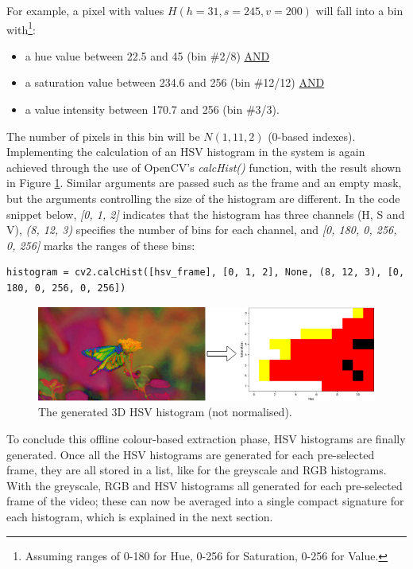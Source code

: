 For example, a pixel with values $H(h=31, s=245, v=200)$ will fall into a bin with\footnote{Assuming ranges of 0-180 for Hue, 0-256 for Saturation, 0-256 for Value.}:
\begin{itemize}
    \item a hue value between 22.5 and 45 (bin \#2/8) \underline{AND}
    \item a saturation value between 234.6 and 256 (bin \#12/12) \underline{AND} 
    \item a value intensity between 170.7 and 256 (bin \#3/3).
\end{itemize}
The number of pixels in this bin will be $N(1,11,2)$ (0-based indexes).\\

Implementing the calculation of an HSV histogram in the system is again achieved through the use of OpenCV's \textit{calcHist()} function, with the result shown in Figure \ref{fig:implementation-hsv_not_normalised}. Similar arguments are passed such as the frame and an empty mask, but the arguments controlling the size of the histogram are different. In the code snippet below, \textit{[0, 1, 2]} indicates that the histogram has three channels (H, S and V), \textit{(8, 12, 3)} specifies the number of bins for each channel, and \textit{[0, 180, 0, 256, 0, 256]} marks the ranges of these bins:

\begin{lstlisting}[numbers=none]
histogram = cv2.calcHist([hsv_frame], [0, 1, 2], None, (8, 12, 3), [0, 180, 0, 256, 0, 256])
\end{lstlisting}

\begin{figure}[h] 
\centerline{\includegraphics[width=\textwidth]{figures/implementation/hsv_not_normalised.png}}
\caption{\label{fig:implementation-hsv_not_normalised}The generated 3D HSV histogram (not normalised).}
\end{figure}

To conclude this offline colour-based extraction phase, HSV histograms are finally generated. Once all the HSV histograms are generated for each pre-selected frame, they are all stored in a list, like for the greyscale and RGB histograms. With the greyscale, RGB and HSV histograms all generated for each pre-selected frame of the video; these can now be averaged into a single compact signature for each histogram, which is explained in the next section.

